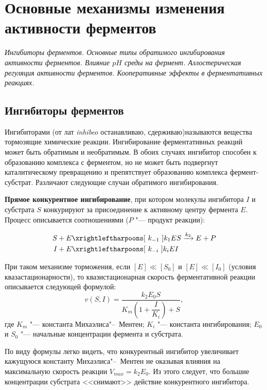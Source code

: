 \documentclass[12pt,a4paper,oneside]{book}
\begin{document}
\newpage
\section{Основные механизмы изменения активности ферментов}
{\it Ингибиторы ферментов. Основные типы обратимого ингибирования активности ферментов. Влияние $pH$ среды на фермент. Аллостерическая регуляция активности ферментов. Кооперативные эффекты в ферментативных реакциях.}

\subsection{Ингибиторы ферментов}

Ингибиторами (от лат \textit{inhibeo} останавливаю, сдерживаю)называются вещества тормозящие химические реакции. Ингибирование ферментативных реакций может быть обратимым и необратимым. В обоих случаях ингибитор способен к образованию комплекса с ферментом, но не может быть подвергнут каталитическому превращению и препятствует образованию комплекса фермент-субстрат. Различают следующие случаи обратимого ингибирования. 

\textbf{Прямое конкурентное ингибирование}, при котором молекулы ингибитора $ I  $ и субстрата $ S $ конкурируют за присоединение к активному центру фермента $ E $. Процесс описывается соотношениями ($P$ "--- продукт реакции): 

\begin{align}
 S + E & \xrightleftharpoons [~k_{-1}~] {k_1}  ES \xrightarrow {k_2} E + P \\ 
 I + E & \xrightleftharpoons [~k_{-i}~] {k_i} EI \nonumber
\end{align}

При таком механизме торможения, если $ [E]\ll[S_0] $ и $ [E]\ll[I_0] $ (условия квазастационарности), то квазистационарная скорость ферментативной реакции описывается следующей формулой:
\begin{equation}
\label{Con} 
v(S, I) =  \dfrac{k_2 E_0 S}{ K_m \left(1 + \dfrac{I}{K_i}\right) + S},
\end{equation}
где $ K_m $ "--- константа Михаэлиса"--~Ментен; $ K_i $ "--- константа ингибирования; $ E_0 $ и $ S_0 $ "--- начальные концентрации фермента и субстрата. 

По виду формулы легко видеть, что конкурентный ингибитор увеличивает кажущуюся константу Михаэлиса"--~Ментен не оказывая влияния на максимальную скорость реакции $ V_{max} = k_2 E_0 $. Из этого следует, что большие концентрации субстрата <<снимают>> действие конкурентного ингибитора. 
\end{document}
